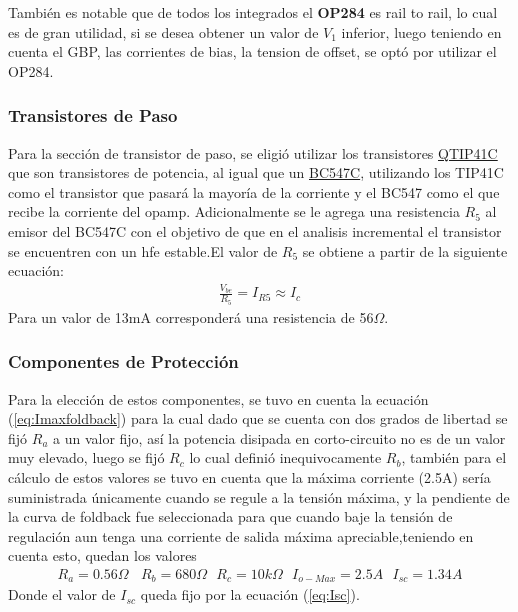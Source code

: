 También es notable que de todos los integrados el \textbf{OP284} es rail to rail, lo cual es de gran utilidad, si se desea obtener un valor de $V_1$ inferior, luego teniendo en cuenta el GBP, las corrientes de bias, la tension de offset, se optó por utilizar el OP284.
\subsubsection{Transistores de Paso}
Para la sección de transistor de paso, se eligió utilizar los transistores \href{https://pdf1.alldatasheet.com/datasheet-pdf/view/532914/FAIRCHILD/TIP31C.html}{QTIP41C} que son transistores de potencia, al igual que un \href{https://pdf1.alldatasheet.com/datasheet-pdf/view/2895/MOTOROLA/BC547C.html}{BC547C}, utilizando los TIP41C como el transistor que pasará la mayoría de la corriente y el BC547 como el que recibe la corriente del opamp.
Adicionalmente se le agrega una resistencia $R_5$ al emisor del BC547C con el objetivo de que en el analisis incremental el transistor se encuentren con un hfe estable.El valor de $R_5$ se obtiene a partir de la siguiente ecuación:
\begin{align}
\frac{V_{be}}{R_5}=I_{R5}\approx I_c
\end{align}
Para un valor de 13mA corresponderá una resistencia de 56$\Omega$.
\subsubsection{Componentes de Protección}

Para la elección de estos componentes, se tuvo en cuenta la ecuación (\ref{eq:Imaxfoldback}) para la cual dado que se cuenta con dos grados de libertad se fijó $R_a$ a un valor fijo, así la potencia disipada en corto-circuito no es de un valor muy elevado, luego se fijó  $R_c$ lo cual definió inequivocamente $R_b$, también para el cálculo de estos valores se tuvo en cuenta que la máxima corriente (2.5A) sería suministrada únicamente cuando se regule a la tensión máxima, y la pendiente de la curva de foldback fue seleccionada para que cuando baje la tensión de regulación aun tenga una corriente de salida máxima apreciable,teniendo en cuenta esto, quedan los valores
\begin{align}
R_a=0.56 \Omega  \ \ \ \ R_b=680\Omega \ \ \ R_c=10k\Omega \ \ \ I_{o-Max}=2.5A \ \ \ I_{sc}= 1.34A
\end{align}
Donde el valor de $I_{sc}$ queda fijo por la ecuación (\ref{eq:Isc}).

